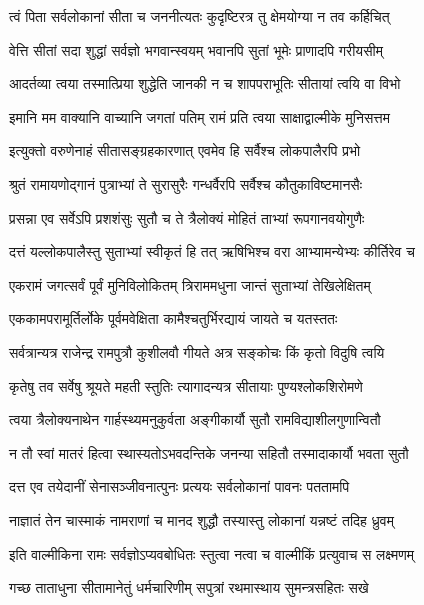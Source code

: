 \twolineshloka
{त्वं पिता सर्वलोकानां सीता च जननीत्यतः}
{कुदृष्टिरत्र तु क्षेमयोग्या न तव कर्हिचित्}%

\twolineshloka
{वेत्ति सीतां सदा शुद्धां सर्वज्ञो भगवान्स्वयम्}
{भवानपि सुतां भूमेः प्राणादपि गरीयसीम्}%

\twolineshloka
{आदर्तव्या त्वया तस्मात्प्रिया शुद्धेति जानकी}
{न च शापपराभूतिः सीतायां त्वयि वा विभो}%

\twolineshloka
{इमानि मम वाक्यानि वाच्यानि जगतां पतिम्}
{रामं प्रति त्वया साक्षाद्वाल्मीके मुनिसत्तम}%

\twolineshloka
{इत्युक्तो वरुणेनाहं सीतासङ्ग्रहकारणात्}
{एवमेव हि सर्वैश्च लोकपालैरपि प्रभो}%

\twolineshloka
{श्रुतं रामायणोद्गानं पुत्राभ्यां ते सुरासुरैः}
{गन्धर्वैरपि सर्वैश्च कौतुकाविष्टमानसैः}%

\twolineshloka
{प्रसन्ना एव सर्वेऽपि प्रशशंसुः सुतौ च ते}
{त्रैलोक्यं मोहितं ताभ्यां रूपगानवयोगुणैः}%

\twolineshloka
{दत्तं यल्लोकपालैस्तु सुताभ्यां स्वीकृतं हि तत्}
{ऋषिभिश्च वरा आभ्यामन्येभ्यः कीर्तिरेव च}%

\twolineshloka
{एकरामं जगत्सर्वं पूर्वं मुनिविलोकितम्}
{त्रिराममधुना जान्तं सुताभ्यां तेखिलेक्षितम्}%

\twolineshloka
{एककामपरामूर्तिर्लोके पूर्वमवेक्षिता}
{कामैश्चतुर्भिरद्यायं जायते च यतस्ततः}%

\twolineshloka
{सर्वत्रान्यत्र राजेन्द्र रामपुत्रौ कुशीलवौ}
{गीयते अत्र सङ्कोचः किं कृतो विदुषि त्वयि}%

\twolineshloka
{कृतेषु तव सर्वेषु श्रूयते महती स्तुतिः}
{त्यागादन्यत्र सीतायाः पुण्यश्लोकशिरोमणे}%

\twolineshloka
{त्वया त्रैलोक्यनाथेन गार्हस्थ्यमनुकुर्वता}
{अङ्गीकार्यौ सुतौ रामविद्याशीलगुणान्वितौ}%

\twolineshloka
{न तौ स्वां मातरं हित्वा स्थास्यतोऽभवदन्तिके}
{जनन्या सहितौ तस्मादाकार्यौ भवता सुतौ}%

\twolineshloka
{दत्त एव तयेदानीं सेनासञ्जीवनात्पुनः}
{प्रत्ययः सर्वलोकानां पावनः पततामपि}%

\twolineshloka
{नाज्ञातं तेन चास्माकं नामराणां च मानद}
{शुद्धौ तस्यास्तु लोकानां यन्नष्टं तदिह ध्रुवम्}%


\twolineshloka
{इति वाल्मीकिना रामः सर्वज्ञोऽप्यवबोधितः}
{स्तुत्वा नत्वा च वाल्मीकिं प्रत्युवाच स लक्ष्मणम्}%

\twolineshloka
{गच्छ ताताधुना सीतामानेतुं धर्मचारिणीम्}
{सपुत्रां रथमास्थाय सुमन्त्रसहितः सखे}%

